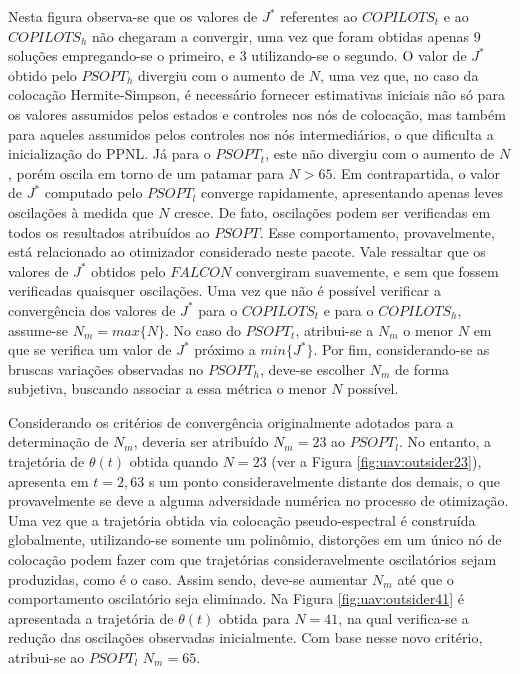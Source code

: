 Nesta figura observa-se que os valores de $ J^* $ referentes ao $ COPILOTS_t $ e ao $ COPILOTS_h $ não chegaram a convergir, uma vez que foram obtidas apenas 9 soluções empregando-se o primeiro, e 3 utilizando-se o segundo.  O valor de $ J^* $ obtido pelo $ PSOPT_h $ divergiu com o aumento de $ N $, uma vez que, no caso da colocação Hermite-Simpson, é necessário fornecer estimativas iniciais não só para os valores assumidos pelos estados e controles nos nós de colocação, mas também para aqueles assumidos pelos controles nos nós intermediários, o que dificulta a inicialização do PPNL. Já para o $ PSOPT_t $, este não divergiu com o aumento de $ N $, porém oscila em torno de um patamar para $ N > 65 $. Em contrapartida, o valor de $ J^* $ computado pelo $ PSOPT_l $ converge rapidamente, apresentando apenas leves oscilações à medida que $ N $ cresce. De fato, oscilações podem ser verificadas em todos os resultados atribuídos ao $ PSOPT $. Esse comportamento, provavelmente, está relacionado ao otimizador considerado neste pacote.  Vale ressaltar que os valores de $ J^* $ obtidos pelo $ FALCON $ convergiram suavemente, e sem que fossem verificadas quaisquer oscilações. Uma vez que não é possível verificar a convergência dos valores de  $ J^* $ para o $ COPILOTS_t $ e para o $ COPILOTS_h$, assume-se $ N_m = max\{N\} $.  No caso do $ PSOPT_t $, atribui-se a $ N_m $ o menor $ N $ em que se verifica um valor de $ J^* $ próximo a $ min\{J^*\} $. Por fim, considerando-se as bruscas variações observadas no $ PSOPT_h $, deve-se escolher $ N_m $ de forma subjetiva, buscando associar a essa métrica o menor $ N $ possível. 

Considerando os critérios de convergência originalmente adotados para a determinação de $ N_m $, deveria ser atribuído $ N_m = 23 $ ao $ PSOPT_l $. No entanto, a trajetória de $ \theta(t) $ obtida quando $ N = 23 $ (ver a Figura \ref{fig:uav:outsider23}), apresenta em $ t = 2,63 $ s um ponto consideravelmente distante dos demais, o que provavelmente se deve a alguma adversidade numérica no processo de otimização. Uma vez que a trajetória obtida via colocação pseudo-espectral é construída globalmente, utilizando-se somente um polinômio, distorções em um único nó de colocação podem fazer com que trajetórias consideravelmente oscilatórios sejam produzidas, como é o caso. Assim sendo, deve-se aumentar $ N_m $ até que o comportamento oscilatório seja eliminado. Na Figura \ref{fig:uav:outsider41} é apresentada a trajetória de $ \theta(t) $ obtida para $ N = 41 $, na qual verifica-se a redução das oscilações observadas inicialmente. Com base nesse novo critério, atribui-se ao $ PSOPT_l $ $ N_m = 65 $.

